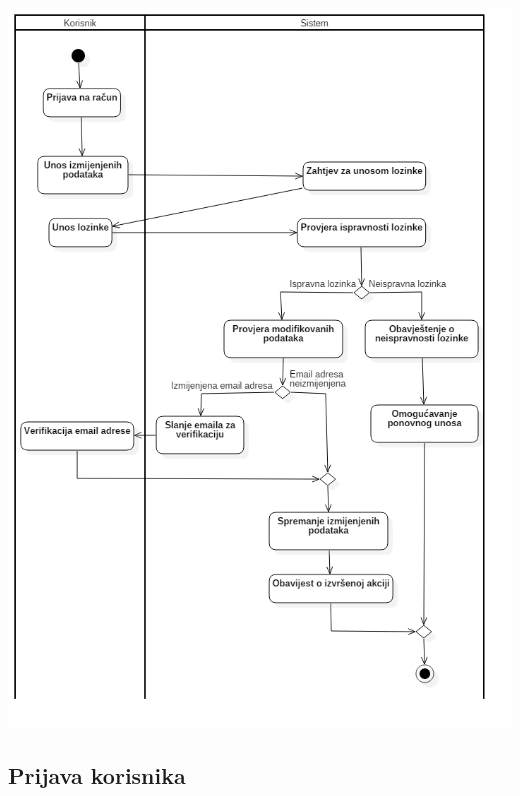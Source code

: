 \begin{center}
    \includegraphics[scale=0.53]{images/ModifikacijaKorisnickihPodataka.png}
\end{center}

\subsection{Prijava korisnika}

